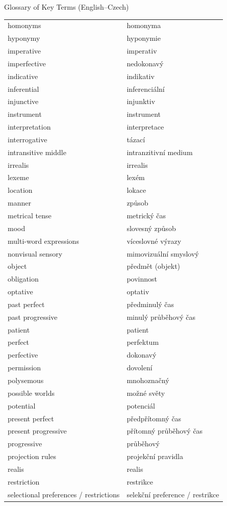 \begin{frame}[allowframebreaks]{Glossary of Key Terms (English--Czech)}
\begin{longtable}{ll}
 homonyms & homonyma \\
 hyponymy & hyponymie \\
 imperative & imperativ \\
 imperfective & nedokonavý \\
 indicative & indikativ \\
 inferential & inferenciální \\
 injunctive & injunktiv \\
 instrument & instrument \\
 interpretation & interpretace \\
 interrogative & tázací \\
 intransitive middle & intranzitivní medium \\
 irrealis & irrealis \\
 lexeme & lexém \\
 location & lokace \\
 manner & způsob \\
 metrical tense & metrický čas \\
 mood & slovesný způsob \\
 multi-word expressions & víceslovné výrazy \\
 nonvisual sensory & mimovizuální smyslový \\
 object & předmět (objekt) \\
 obligation & povinnost \\
 optative & optativ \\
 past perfect & předminulý čas \\
 past progressive & minulý průběhový čas \\
 patient & patient \\
 perfect & perfektum \\
 perfective & dokonavý \\
 permission & dovolení \\
 polysemous & mnohoznačný \\
 possible worlds & možné světy \\
 potential & potenciál \\
 present perfect & předpřítomný čas \\
 present progressive & přítomný průběhový čas \\
 progressive & průběhový \\
 projection rules & projekční pravidla \\
 realis & realis \\
 restriction & restrikce \\
 selectional preferences / restrictions & selekční preference / restrikce \\

\end{longtable}
\end{frame}
